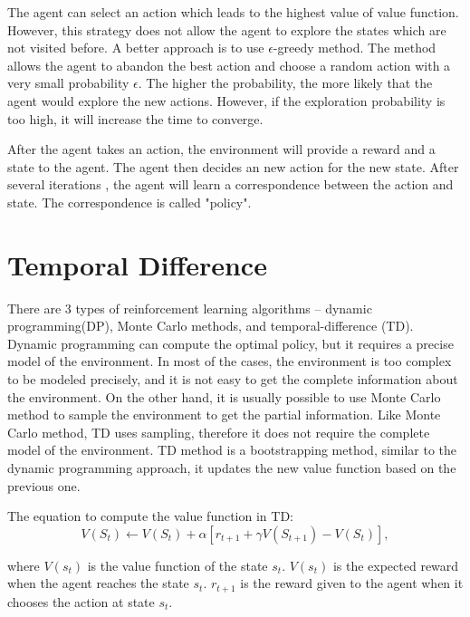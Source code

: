 The agent can select an action which leads to the highest value of value function. However, 
this strategy does not allow the agent to explore the states which are not visited before.
A better approach is to use $\epsilon$-greedy method. The method allows the agent to abandon the
best action and choose
a random action with a very small probability $\epsilon$. The higher the probability, the more
likely that the agent would explore the new actions. However, if the exploration probability 
is too high, it will increase the time to converge.

After the agent takes an action, the environment will provide a reward and a state to the
agent. The agent then decides an new action for the new state. After several iterations
, the agent will learn a correspondence between the action and state. The correspondence is called 
"policy". 

\section{Temporal Difference}
\label{sec:TD}
There are 3 types of reinforcement learning algorithms -- dynamic programming(DP), Monte Carlo 
methods, and temporal-difference (TD). Dynamic programming can compute the optimal policy, but it 
requires a precise model of the environment. In most of the cases, the environment
is too complex to be modeled precisely, and it is not easy to get the complete information about
the environment. On the other hand, it is usually possible to use Monte Carlo method to sample the environment to
get the partial information. 
Like Monte Carlo method, TD uses sampling, therefore it does not require the 
complete model of the environment. TD method is a bootstrapping method, similar to the dynamic 
programming approach, it updates the new value function based on the previous one.

The equation to compute the value function in TD:
\begin{displaymath}
   V(S_t) \leftarrow V(S_t) + \alpha [r_{t+1} + \gamma V(S_{t+1}) - V(S_t)],
\end{displaymath}

where $V(s_t)$ is the value function of the state $s_t$. $V(s_t)$ is the expected reward when
the agent reaches the state $s_t$. $r_{t+1}$ is the reward given to the agent when it chooses
the action at state $s_t$.

